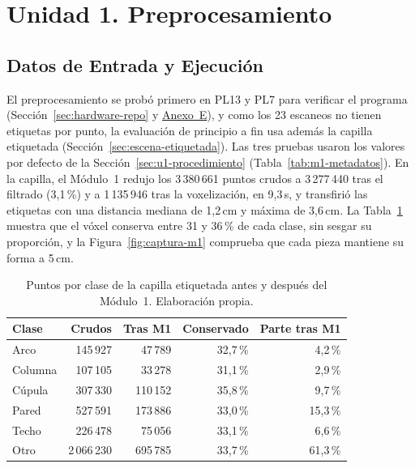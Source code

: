 \FloatBarrier
\section[Unidad 1. Preprocesamiento]{Unidad 1. Preprocesamiento}
\label{sec:res-unidad1}

\FloatBarrier
\subsection[Datos de Entrada y Ejecución]{Datos de Entrada y Ejecución}
\label{sec:res-u1-datos}

El preprocesamiento se probó primero en PL13 y PL7 para verificar el programa
(Sección~\ref{sec:hardware-repo} y \hyperref[sec:anexo-evidencia-m1]{Anexo~E}), y como
los 23 escaneos no tienen etiquetas por punto, la evaluación de principio a fin usa
además la capilla etiquetada (Sección~\ref{sec:escena-etiquetada}). Las tres pruebas usaron los valores por defecto
de la Sección~\ref{sec:u1-procedimiento} (Tabla~\ref{tab:m1-metadatos}). En la capilla,
el Módulo~1 redujo los 3\,380\,661 puntos crudos a 3\,277\,440 tras el filtrado
(3{,}1\,\%) y a 1\,135\,946 tras la voxelización, en 9{,}3\,s, y transfirió las
etiquetas con una distancia mediana de 1{,}2\,cm y máxima de 3{,}6\,cm. La
Tabla~\ref{tab:capilla-clases} muestra que el vóxel conserva entre 31 y 36\,\% de
cada clase, sin sesgar su proporción, y la Figura~\ref{fig:captura-m1} comprueba
que cada pieza mantiene su forma a 5\,cm.

\begin{table}[!htbp]
\centering
{}\small
\caption[Clases de la capilla antes y después del Módulo 1]{Puntos por clase de la capilla etiquetada antes y después del Módulo~1. Elaboración propia.}
\label{tab:capilla-clases}
\begin{tabular}{@{}lrrrr@{}}
\toprule
\textbf{Clase} & \textbf{Crudos} & \textbf{Tras M1} & \textbf{Conservado} & \textbf{Parte tras M1} \\
\midrule
Arco & 145\,927 & 47\,789 & 32{,}7\,\% & 4{,}2\,\% \\
Columna & 107\,105 & 33\,278 & 31{,}1\,\% & 2{,}9\,\% \\
Cúpula & 307\,330 & 110\,152 & 35{,}8\,\% & 9{,}7\,\% \\
Pared & 527\,591 & 173\,886 & 33{,}0\,\% & 15{,}3\,\% \\
Techo & 226\,478 & 75\,056 & 33{,}1\,\% & 6{,}6\,\% \\
Otro & 2\,066\,230 & 695\,785 & 33{,}7\,\% & 61{,}3\,\% \\
\bottomrule
\end{tabular}
\end{table}

